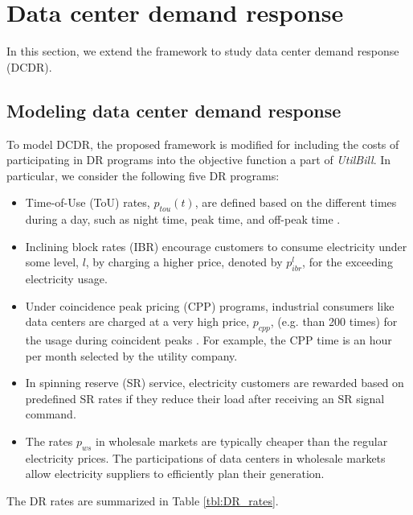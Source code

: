 \section{Data center demand response}
\label{sec:DR_evaluation}

In this section, we extend the framework to study data center demand response (DCDR).


\subsection{Modeling data center demand response}
\begin{table}[!ht]
\end{table}

To model DCDR, the proposed framework is modified for including the costs of participating in DR programs into the objective function a part of \textit{UtilBill}. In particular, we consider the following five DR programs:
\begin{itemize}
	\item Time-of-Use (ToU) rates, $p_{tou}(t)$, are defined based on the different times during a day, such as night time, peak time, and off-peak time \cite{ToURates}.
	\item Inclining block rates (IBR) encourage customers to consume electricity under some level, $l$, by charging a higher price, denoted by $p^l_{ibr}$, for the exceeding electricity usage.
	\item Under coincidence peak pricing (CPP) programs, industrial consumers like data centers are charged at a very high price, $p_{cpp}$, (e.g. than 200 times) for the usage during coincident peaks \cite{liu2013data}. For example, the CPP time is an hour per month selected by the utility company.
	\item In spinning reserve (SR) service, electricity customers are rewarded based on predefined SR rates if they reduce their load after receiving an SR signal command. 
	\item The rates $p_{ws}$ in wholesale markets are typically cheaper than the regular electricity prices. The participations of data centers in wholesale markets allow electricity suppliers to efficiently plan their generation.
\end{itemize}
The DR rates are summarized in Table \ref{tbl:DR_rates}.


